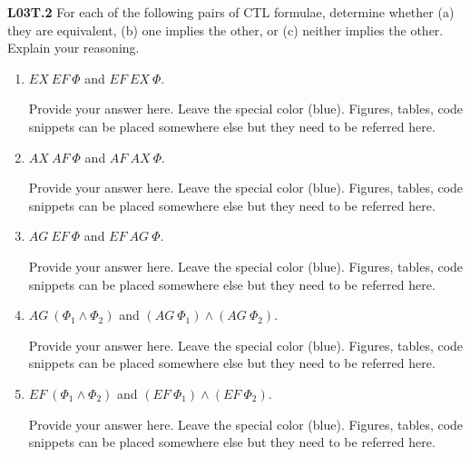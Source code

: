 \documentclass[12pt,a4paper]{article}
\begin{document}
\begin{description}
\begin{enumerate}[label=\alph*)]
\end{enumerate}
\item{\bf L03T.2} For each of the following pairs of CTL formulae, determine whether (a) they are equivalent, (b) one implies the other,
or (c) neither implies the other. Explain your reasoning.
\begin{enumerate}[label=\alph*)]
\item $EX\ EF\ \Phi$ and $EF\ EX\ \Phi$.
%
\ifwithanswers
\color{blue}
\par
Provide your answer here. Leave the special color (blue). Figures, tables, code snippets can be placed somewhere else but they need to be referred here.
\color{black}
\fi
%
\item $AX\ AF\ \Phi$ and $AF\ AX\ \Phi$.
%
\ifwithanswers
\color{blue}
\par
Provide your answer here. Leave the special color (blue). Figures, tables, code snippets can be placed somewhere else but they need to be referred here.
\color{black}
\fi
%
\item $AG\ EF\ \Phi$ and $EF\ AG\ \Phi$.
%
\ifwithanswers
\color{blue}
\par
Provide your answer here. Leave the special color (blue). Figures, tables, code snippets can be placed somewhere else but they need to be referred here.
\color{black}
\fi
%
\item $AG\ (\Phi_1 \land \Phi_2)$ and $(AG\ \Phi_1) \land (AG\ \Phi_2)$.
%
\ifwithanswers
\color{blue}
\par
Provide your answer here. Leave the special color (blue). Figures, tables, code snippets can be placed somewhere else but they need to be referred here.
\color{black}
\fi
%
\item $EF\ (\Phi_1 \land \Phi_2)$ and $(EF\ \Phi_1) \land (EF\ \Phi_2)$.
%
\ifwithanswers
\color{blue}
\par
Provide your answer here. Leave the special color (blue). Figures, tables, code snippets can be placed somewhere else but they need to be referred here.
\color{black}
\fi
%

\end{enumerate}
\end{description}
\end{document}
